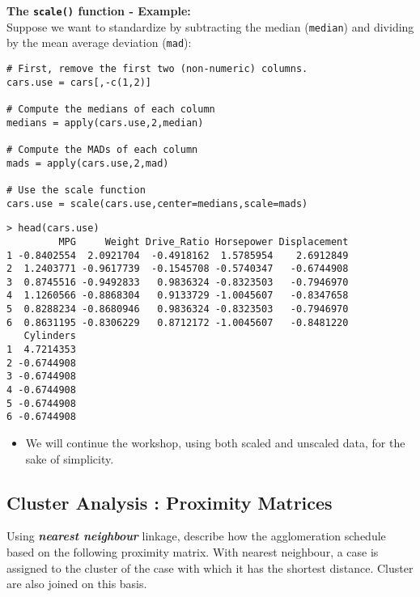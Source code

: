 \documentclass[12pt]{article}
\begin{document}
\newpage
\noindent \textbf{The \texttt{scale()} function - Example:} \\ Suppose we want to standardize by subtracting the median (\texttt{median}) and dividing by the mean average deviation (\texttt{mad}):
\begin{framed}
\begin{verbatim}
# First, remove the first two (non-numeric) columns.
cars.use = cars[,-c(1,2)]  

# Compute the medians of each column
medians = apply(cars.use,2,median)

# Compute the MADs of each column
mads = apply(cars.use,2,mad)

# Use the scale function
cars.use = scale(cars.use,center=medians,scale=mads)
\end{verbatim}
\end{framed}
\newpage
\begin{verbatim}
> head(cars.use)
         MPG     Weight Drive_Ratio Horsepower Displacement
1 -0.8402554  2.0921704  -0.4918162  1.5785954    2.6912849
2  1.2403771 -0.9617739  -0.1545708 -0.5740347   -0.6744908
3  0.8745516 -0.9492833   0.9836324 -0.8323503   -0.7946970
4  1.1260566 -0.8868304   0.9133729 -1.0045607   -0.8347658
5  0.8288234 -0.8680946   0.9836324 -0.8323503   -0.7946970
6  0.8631195 -0.8306229   0.8712172 -1.0045607   -0.8481220
   Cylinders
1  4.7214353
2 -0.6744908
3 -0.6744908
4 -0.6744908
5 -0.6744908
6 -0.6744908

\end{verbatim}
\begin{itemize} 
\item We will continue the workshop, using both scaled and unscaled data, for the sake of simplicity.
\end{itemize} 

\newpage
\subsection{{\large Cluster Analysis : Proximity Matrices}}

Using \textbf{\textit{nearest neighbour}} linkage, describe how the agglomeration schedule based on the following 
proximity matrix. With nearest neighbour, a case is assigned to the cluster of the case with which it has the shortest distance. Cluster are also joined on this basis.
\end{document}

